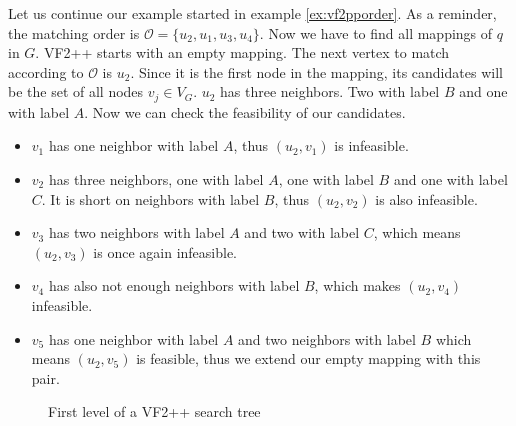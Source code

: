 \begin{example}
    Let us continue our example started in example \ref{ex:vf2pporder}. As a reminder, the matching order is
    $\mathcal{O} = \{u_2, u_1, u_3, u_4\}$. Now we have to find all mappings of $q$ in $G$. VF2++ starts
    with an empty mapping. The next vertex to match according to $\mathcal{O}$ is $u_2$. Since it is
    the first node in the mapping, its candidates will be the set of all nodes $v_j \in V_G$. $u_2$ has
    three neighbors. Two with label $B$ and one with label $A$. Now we can check the feasibility of our
    candidates.

    \begin{itemize}
        \item $v_1$ has one neighbor with label $A$, thus $(u_2, v_1)$ is infeasible.
        \item $v_2$ has three neighbors, one with label $A$, one with label $B$ and one with label $C$. It is short on neighbors with label $B$, thus $(u_2, v_2)$ is also infeasible.
        \item $v_3$ has two neighbors with label $A$ and two with label $C$, which means $(u_2, v_3)$ is once again infeasible.
        \item $v_4$ has also not enough neighbors with label $B$, which makes $(u_2, v_4)$ infeasible.
        \item $v_5$ has one neighbor with label $A$ and two neighbors with label $B$ which means $(u_2, v_5)$ is feasible, thus we extend our empty mapping with this pair.
    \end{itemize}

    \begin{figure}[h!]
        \centering
        \caption{First level of a VF2++ search tree}
        \label{fig:vf2ppfirst}
    \end{figure}


\end{example}
